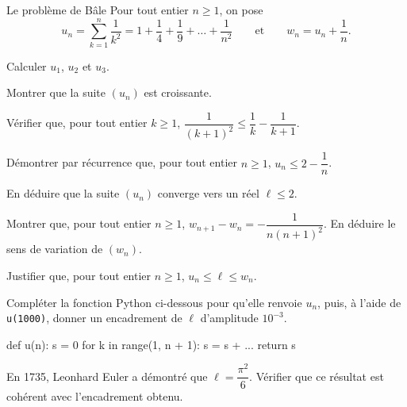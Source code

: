 \begin{exercice}[3]{Le problème de Bâle}
Pour tout entier $n\geq1$, on pose
\[
  u_n=\sum_{k=1}^{n}\frac{1}{k^{2}}=1+\frac{1}{4}+\frac{1}{9}+\dots+\frac{1}{n^{2}}
  \qquad\text{et}\qquad w_n=u_n+\frac{1}{n}.
\]
\begin{questions}
  \item Calculer $u_1$, $u_2$ et $u_3$.
  \item Montrer que la suite $(u_n)$ est croissante.
  \item \begin{questions}
      \item Vérifier que, pour tout entier $k\geq1$, $\dfrac{1}{(k+1)^{2}}\leq\dfrac{1}{k}-\dfrac{1}{k+1}$.
      \item Démontrer par récurrence que, pour tout entier $n\geq1$, $u_n\leq2-\dfrac{1}{n}$.
    \end{questions}
  \item En déduire que la suite $(u_n)$ converge vers un réel $\ell\leq2$.
\end{questions}
\begin{questions}[resume]
  \item Montrer que, pour tout entier $n\geq1$, $w_{n+1}-w_n=-\dfrac{1}{n(n+1)^{2}}$.
    En déduire le sens de variation de $(w_n)$.
  \item Justifier que, pour tout entier $n\geq1$, $u_n\leq\ell\leq w_n$.
  \item Compléter la fonction Python ci-dessous pour qu'elle renvoie $u_n$, puis, à l'aide de
    \lstinline[style=otPython]!u(1000)!, donner un encadrement de $\ell$ d'amplitude $10^{-3}$.
\begin{python}
def u(n):
    s = 0
    for k in range(1, n + 1):
        s = s + ...
    return s
\end{python}
  \item En 1735, Leonhard Euler a démontré que $\ell=\dfrac{\pi^{2}}{6}$.
    Vérifier que ce résultat est cohérent avec l'encadrement obtenu.
\end{questions}
\end{exercice}
